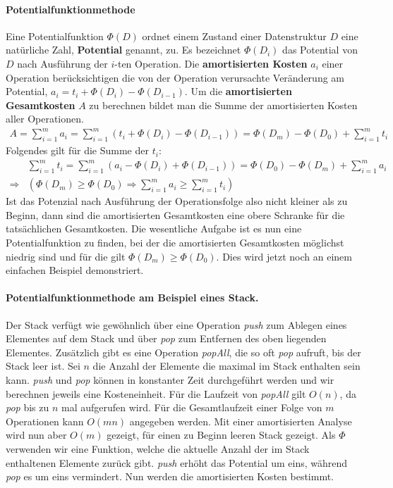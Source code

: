 \documentclass[a4paper,12pt]{article}
\begin{document}
\paragraph{Potentialfunktionmethode} \label{potentialfunktionsmethode} Eine Potentialfunktion $\Phi(D)$ ordnet einem Zustand einer Datenstruktur $D$ eine natürliche Zahl, \textbf{Potential} genannt, zu. Es bezeichnet $\Phi(D_i)$ das Potential von $D$ nach Ausführung der $i$-ten Operation. Die \textbf{amortisierten Kosten} $a_i$ einer Operation berücksichtigen die von der Operation verursachte Veränderung am Potential, $a_i = t_i + \Phi(D_{i}) - \Phi(D_{i-1})$. Um die \textbf{amortisierten Gesamtkosten} $A$ zu berechnen bildet man die Summe der amortisierten Kosten aller Operationen. 
\begin{align*}
A = \sum_{i = 1}^{m} a_i =  \sum_{i = 1}^{m} \left(t_i + \Phi\left(D_{i}\right) - \Phi\left(D_{i-1}\right)\right) = \Phi\left(D_{m}\right) - \Phi\left(D_{0}\right) + \sum_{i = 1}^{m} t_i 
\end{align*}
Folgendes gilt für die Summe der $t_i$:
\begin{align*}
&\sum_{i = 1}^{m} t_i =  \sum_{i = 1}^{m} \left(a_i - \Phi\left(D_{i}\right) + \Phi\left(D_{i-1}\right)\right) = \Phi\left(D_{0}\right) - \Phi\left(D_{m}\right) + \sum_{i = 1}^{m} a_i \\
\Rightarrow &\left( \Phi\left(D_{m}\right) \geq \Phi\left(D_{0}\right) \Rightarrow \sum_{i = 1}^{m} a_i \geq \sum_{i = 1}^{m} t_i \right)
\end{align*}
Ist das Potenzial nach Ausführung der Operationsfolge also nicht kleiner als zu Beginn, dann sind die amortisierten Gesamtkosten eine obere Schranke für die tatsächlichen Gesamtkosten. Die wesentliche Aufgabe ist es nun eine Potentialfunktion zu finden, bei der die amortisierten Gesamtkosten möglichst niedrig sind und für die gilt $\Phi\left(D_{m}\right) \geq \Phi\left(D_{0}\right)$. Dies wird jetzt noch an einem einfachen Beispiel demonstriert.

\paragraph{Potentialfunktionmethode am Beispiel eines Stack.} 
Der Stack verfügt wie gewöhnlich über eine Operation \textit{push} zum Ablegen eines Elementes auf dem Stack und über \textit{pop} zum Entfernen des oben liegenden Elementes. Zusätzlich gibt es eine Operation \textit{popAll}, die so oft \textit{pop} aufruft, bis der Stack leer ist. Sei $n$ die Anzahl der Elemente die maximal im Stack enthalten sein kann. \textit{push} und \textit{pop} können in konstanter Zeit durchgeführt werden und wir berechnen jeweils eine Kosteneinheit. Für die Laufzeit von \textit{popAll} gilt $O(n)$, da \textit{pop} bis zu $n$ mal aufgerufen wird. Für die Gesamtlaufzeit einer Folge von $m$ Operationen kann $O(mn)$ angegeben werden. Mit einer amortisierten Analyse wird nun aber $O(m)$ gezeigt, für einen zu Beginn leeren Stack gezeigt. Als $\Phi$ verwenden wir eine Funktion, welche die aktuelle Anzahl der im Stack enthaltenen Elemente zurück gibt. \textit{push} erhöht das Potential um eins, während \textit{pop} es um eins vermindert. Nun werden die amortisierten Kosten bestimmt. 
\end{document}
